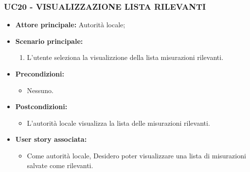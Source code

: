 \subsubsection{UC20 - VISUALIZZAZIONE LISTA RILEVANTI}
\begin{itemize}
    \item \textbf{Attore principale:} Autorità locale;
    \item \textbf{Scenario principale:}
          \begin{enumerate}
              \item L'utente seleziona la visualizzione della lista misurazioni rilevanti.
          \end{enumerate}
    \item \textbf{Precondizioni:}
          \begin{itemize}
              \item  Nessuno.
          \end{itemize}
    \item \textbf{Postcondizioni:}
          \begin{itemize}
              \item  L'autorità locale visualizza la lista delle misurazioni rilevanti.
          \end{itemize}
    \item \textbf{User story associata:}
          \begin{itemize}
              \item Come autorità locale,
                    Desidero poter visualizzare una lista di misurazioni salvate come rilevanti.
          \end{itemize}
\end{itemize}